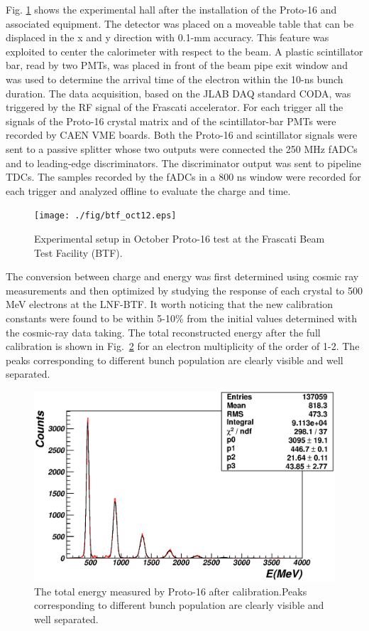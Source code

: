 Fig. \ref{fig:btf} shows the experimental hall after the installation
of the Proto-16 and associated equipment. The detector was placed on a
moveable table that can be displaced in the x and y direction with
0.1-mm accuracy. This feature was exploited to center the calorimeter
with respect to the beam. A plastic scintillator bar, read by two
PMTs, was placed in front of the beam pipe exit window and was used to
determine the arrival time of the electron within the 10-ns bunch
duration. The data acquisition, based on the JLAB DAQ standard CODA,
was triggered by the RF signal of the Frascati accelerator. For each
trigger all the signals of the Proto-16 crystal matrix and of the
scintillator-bar PMTs were recorded by CAEN VME boards. Both the
Proto-16 and scintillator signals were sent to a passive splitter
whose two outputs were connected the 250 MHz fADCs and to leading-edge
discriminators. The discriminator output was sent to pipeline
TDCs. The samples recorded by the fADCs in a 800 ns window were recorded for
each trigger and analyzed offline to evaluate the charge and time.

\begin{figure}
\texttt{[image: ./fig/btf\_oct12.eps]}
\caption{Experimental setup in October Proto-16 test at the Frascati Beam Test Facility (BTF).}
\label{fig:btf}
\end{figure}

The conversion between charge and energy  was first determined using cosmic ray measurements and  then
optimized  by studying the response of each crystal
to 500 MeV electrons at the LNF-BTF. It worth noticing that the new calibration constants were
found to be within 5-10\% from the initial values determined with the
cosmic-ray data taking.
The total reconstructed energy  after
the full calibration is shown in Fig.~\ref{fig:btf_etot} for an
electron multiplicity of the order of 1-2. The peaks corresponding to
different bunch population are clearly visible and well
separated. 
\begin{figure}
\includegraphics[width=1.0\columnwidth]{./fig/btf_etot_1876_2_6.eps}
\caption{The  total energy measured by Proto-16 after 
  calibration.Peaks corresponding to different
  bunch population are clearly visible and well separated. }
\label{fig:btf_etot}
\end{figure}

